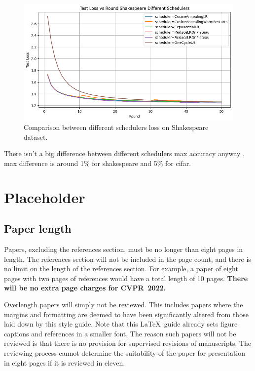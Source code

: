 \documentclass[10pt,twocolumn,letterpaper]{article}
\def\confName{CVPR}
\def\confYear{2022}
\begin{document}
\begin{figure}[h]
\centering
\includegraphics[width=\linewidth]{images/shakespeare_loss.png}
\caption{Comparison between different schedulers loss on Shakespeare dataset.}
\label{fig:short-b}
\end{figure}
There isn't a big difference between different schedulers max accuracy anyway , max difference is around 1\% for shakespeare and 5\% for cifar.
\section{Placeholder}
\subsection{Paper length}
Papers, excluding the references section, must be no longer than eight pages in length.
The references section will not be included in the page count, and there is no limit on the length of the references section.
For example, a paper of eight pages with two pages of references would have a total length of 10 pages.
{\bf There will be no extra page charges for \confName\ \confYear.}

Overlength papers will simply not be reviewed.
This includes papers where the margins and formatting are deemed to have been significantly altered from those laid down by this style guide.
Note that this \LaTeX\ guide already sets figure captions and references in a smaller font.
The reason such papers will not be reviewed is that there is no provision for supervised revisions of manuscripts.
The reviewing process cannot determine the suitability of the paper for presentation in eight pages if it is reviewed in eleven.

\end{document}

